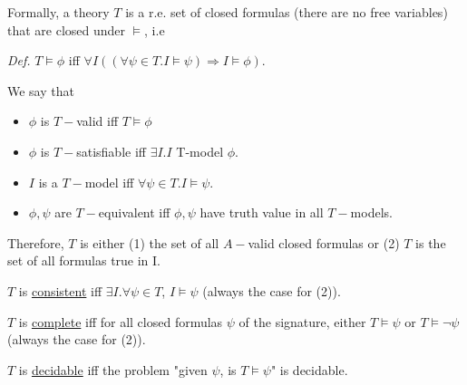 Formally, a theory $T$ is a r.e. set of closed formulas (there are no free variables) that are closed under $\models$, i.e 

\textit{Def.} $T \models \phi$  iff $\forall I ((\forall \psi \in T. I \models \psi) \Rightarrow I \models \phi)$. 

We say that 
\begin{itemize}
    \item $\phi$ is $T-$valid iff $T \models \phi$
    \item $\phi$ is $T-$satisfiable iff $\exists I. I$ T-model $\phi$.
    \item $I$ is a $T-$model iff $\forall \psi \in T. I \models \psi$.
    \item $\phi, \psi$ are $T-$equivalent iff $\phi,\psi$ have truth value in all $T-$models.
\end{itemize}
Therefore, $T$ is either (1) the set of all $A-$valid closed formulas or (2) $T$ is the set of all formulas true in I.

$T$ is \underline{consistent} iff $\exists I. \forall \psi \in T$, $I\models \psi$ (always the case for (2)).

$T$ is \underline{complete} iff for all closed formulas $\psi$ of the signature, either $T \models \psi$ or $T \models \neg \psi$ (always the case for (2)).

$T$ is \underline{decidable} iff the problem "given $\psi$, is $T \models \psi$" is decidable.

